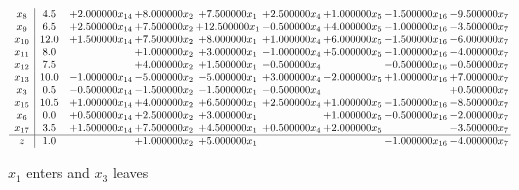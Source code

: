 \documentclass[10pt]{article}
\begin{document}
 \[\begin{array}{c| c c@{\hskip 2pt} c@{\hskip 2pt} c@{\hskip 2pt} c@{\hskip 2pt} c@{\hskip 2pt} c@{\hskip 2pt} c@{\hskip 2pt} }
 x_{8}   &  4.5 & + 2.000000 x_{14} & + 8.000000 x_{2} & + 7.500000 x_{1} & + 2.500000 x_{4} & + 1.000000 x_{5} & -1.500000 x_{16} & -9.500000 x_{7}\\
 x_{9}   &  6.5 & + 2.500000 x_{14} & + 7.500000 x_{2} & + 12.500000 x_{1} & -0.500000 x_{4} & + 4.000000 x_{5} & -1.000000 x_{16} & -3.500000 x_{7}\\
 x_{10}   &  12.0 & + 1.500000 x_{14} & + 7.500000 x_{2} & + 8.000000 x_{1} & + 1.000000 x_{4} & + 6.000000 x_{5} & -1.500000 x_{16} & -6.000000 x_{7}\\
 x_{11}   &  8.0  &   & + 1.000000 x_{2} & + 3.000000 x_{1} & -1.000000 x_{4} & + 5.000000 x_{5} & -1.000000 x_{16} & -4.000000 x_{7}\\
 x_{12}   &  7.5  &   & + 4.000000 x_{2} & + 1.500000 x_{1} & -0.500000 x_{4} &   & -0.500000 x_{16} & -0.500000 x_{7}\\
 x_{13}   &  10.0 & -1.000000 x_{14} & -5.000000 x_{2} & -5.000000 x_{1} & + 3.000000 x_{4} & -2.000000 x_{5} & + 1.000000 x_{16} & + 7.000000 x_{7}\\
 x_{3}   &  0.5 & -0.500000 x_{14} & -1.500000 x_{2} & -1.500000 x_{1} & -0.500000 x_{4} &    &   & + 0.500000 x_{7}\\
 x_{15}   &  10.5 & + 1.000000 x_{14} & + 4.000000 x_{2} & + 6.500000 x_{1} & + 2.500000 x_{4} & + 1.000000 x_{5} & -1.500000 x_{16} & -8.500000 x_{7}\\
 x_{6}   &  0.0 & + 0.500000 x_{14} & + 2.500000 x_{2} & + 3.000000 x_{1} &   & + 1.000000 x_{5} & -0.500000 x_{16} & -2.000000 x_{7}\\
 x_{17}   &  3.5 & + 1.500000 x_{14} & + 7.500000 x_{2} & + 4.500000 x_{1} & + 0.500000 x_{4} & + 2.000000 x_{5} &   & -3.500000 x_{7}\\
\hline
z    &  1.0  &   & + 1.000000 x_{2} & + 5.000000 x_{1} &    &   & -1.000000 x_{16} & -4.000000 x_{7}\\
\end{array}\]


 $ x_{1} $ enters and $ x_{3} $ leaves 
\end{document}
